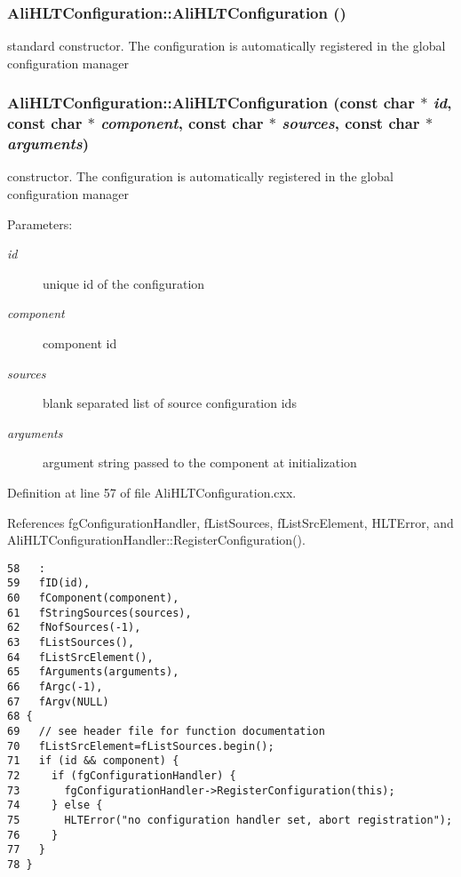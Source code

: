 \subsubsection{\setlength{\rightskip}{0pt plus 5cm}Ali\-HLTConfiguration::Ali\-HLTConfiguration ()}\label{classAliHLTConfiguration_a0}


standard constructor. The configuration is automatically registered in the global configuration manager 
\subsubsection{\setlength{\rightskip}{0pt plus 5cm}Ali\-HLTConfiguration::Ali\-HLTConfiguration (const char $\ast$ {\em id}, const char $\ast$ {\em component}, const char $\ast$ {\em sources}, const char $\ast$ {\em arguments})}\label{classAliHLTConfiguration_a1}


constructor. The configuration is automatically registered in the global configuration manager \begin{Desc}
\item[Parameters:]
\begin{description}
\item[{\em id}]unique id of the configuration \item[{\em component}]component id \item[{\em sources}]blank separated list of source configuration ids \item[{\em arguments}]argument string passed to the component at initialization \end{description}
\end{Desc}


Definition at line 57 of file Ali\-HLTConfiguration.cxx.

References fg\-Configuration\-Handler, f\-List\-Sources, f\-List\-Src\-Element, HLTError, and Ali\-HLTConfiguration\-Handler::Register\-Configuration().

\footnotesize\begin{verbatim}58   :
59   fID(id),
60   fComponent(component),
61   fStringSources(sources),
62   fNofSources(-1),
63   fListSources(),
64   fListSrcElement(),
65   fArguments(arguments),
66   fArgc(-1),
67   fArgv(NULL)
68 {
69   // see header file for function documentation
70   fListSrcElement=fListSources.begin();
71   if (id && component) {
72     if (fgConfigurationHandler) {
73       fgConfigurationHandler->RegisterConfiguration(this);
74     } else {
75       HLTError("no configuration handler set, abort registration");
76     }
77   }
78 }

\end{verbatim}\normalsize 


